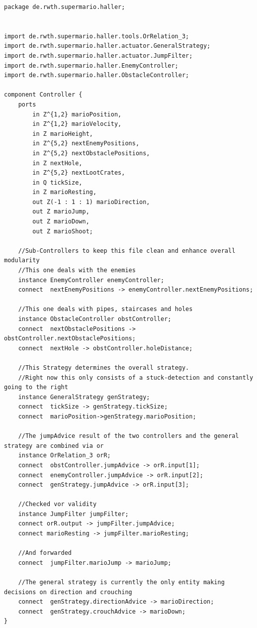 \begin{lstlisting}[caption=SuperMarioWrapper.emam, morekeywords={package, stream, tick, for, ports, port, connect, component, in, out, instance, ->},
frame=single, basicstyle=\tiny]
package de.rwth.supermario.haller;


import de.rwth.supermario.haller.tools.OrRelation_3;
import de.rwth.supermario.haller.actuator.GeneralStrategy;
import de.rwth.supermario.haller.actuator.JumpFilter;
import de.rwth.supermario.haller.EnemyController;
import de.rwth.supermario.haller.ObstacleController;

component Controller {
    ports
        in Z^{1,2} marioPosition,
        in Z^{1,2} marioVelocity,
        in Z marioHeight,
        in Z^{5,2} nextEnemyPositions,
        in Z^{5,2} nextObstaclePositions,
        in Z nextHole,
        in Z^{5,2} nextLootCrates,
        in Q tickSize,
        in Z marioResting,
        out Z(-1 : 1 : 1) marioDirection,
        out Z marioJump,
        out Z marioDown,
        out Z marioShoot;
        
    //Sub-Controllers to keep this file clean and enhance overall modularity
    //This one deals with the enemies
    instance EnemyController enemyController;
    connect  nextEnemyPositions -> enemyController.nextEnemyPositions;
    
    //This one deals with pipes, staircases and holes
    instance ObstacleController obstController;
    connect  nextObstaclePositions -> obstController.nextObstaclePositions;
    connect  nextHole -> obstController.holeDistance;
    
    //This Strategy determines the overall strategy.
    //Right now this only consists of a stuck-detection and constantly going to the right
    instance GeneralStrategy genStrategy;
    connect  tickSize -> genStrategy.tickSize;
    connect  marioPosition->genStrategy.marioPosition;
    
    //The jumpAdvice result of the two controllers and the general strategy are combined via or    
    instance OrRelation_3 orR;
    connect  obstController.jumpAdvice -> orR.input[1];
    connect  enemyController.jumpAdvice -> orR.input[2];
    connect  genStrategy.jumpAdvice -> orR.input[3];
    
    //Checked vor validity
    instance JumpFilter jumpFilter;
    connect orR.output -> jumpFilter.jumpAdvice;
    connect marioResting -> jumpFilter.marioResting;
    
    //And forwarded 
    connect  jumpFilter.marioJump -> marioJump;
    
    //The general strategy is currently the only entity making decisions on direction and crouching
    connect  genStrategy.directionAdvice -> marioDirection;
    connect  genStrategy.crouchAdvice -> marioDown;
}
\end{lstlisting}